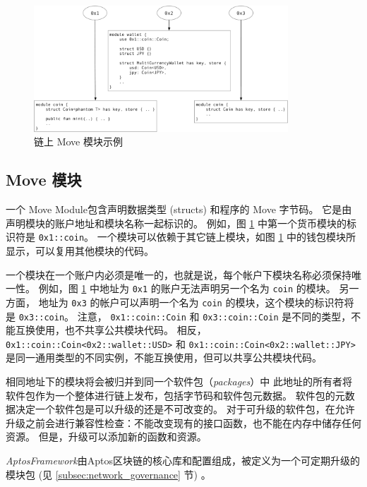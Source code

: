 \documentclass{article}
\begin{document}
\begin{figure}
\centering
\includegraphics[width=0.85\textwidth]{move_1.pdf}
\caption{\label{fig:move_modules}链上 Move 模块示例}
\end{figure}

\subsection{Move 模块}

一个 Move Module包含声明数据类型 (structs) 和程序的 Move 字节码。 它是由声明模块的账户地址和模块名称一起标识的。 例如，图 \ref{fig:move_modules} 中第一个货币模块的标识符是 \texttt{0x1::coin}。 一个模块可以依赖于其它链上模块，如图 \ref{fig:move_modules} 中的钱包模块所显示，可以复用其他模块的代码。

一个模块在一个账户内必须是唯一的，也就是说，每个帐户下模块名称必须保持唯一性。 例如，图 \ref{fig:move_modules} 中地址为 \texttt{0x1} 的账户无法声明另一个名为 \texttt{coin} 的模块。 另一方面， 地址为 \texttt{0x3} 的帐户可以声明一个名为 \texttt{coin} 的模块，这个模块的标识符将是 \texttt{0x3::coin}。 注意， \texttt{0x1::coin::Coin} 和 \texttt{0x3::coin::Coin} 是不同的类型，不能互换使用，也不共享公共模块代码。 相反，\texttt{0x1::coin::Coin<0x2::wallet::USD>} 和 \texttt{0x1::coin::Coin<0x2::wallet::JPY>} 是同一通用类型的不同实例，不能互换使用，但可以共享公共模块代码。

相同地址下的模块将会被归并到同一个软件包（\emph{packages}）中 此地址的所有者将软件包作为一个整体进行链上发布，包括字节码和软件包元数据。 软件包的元数据决定一个软件包是可以升级的还是不可改变的。 对于可升级的软件包，在允许升级之前会进行兼容性检查：不能改变现有的接口函数，也不能在内存中储存任何资源。 但是，升级可以添加新的函数和资源。

\emph{AptosFramework}由Aptos区块链的核心库和配置组成，被定义为一个可定期升级的模块包 (见 \ref{subsec:network_governance} 节) 。
\end{document}
